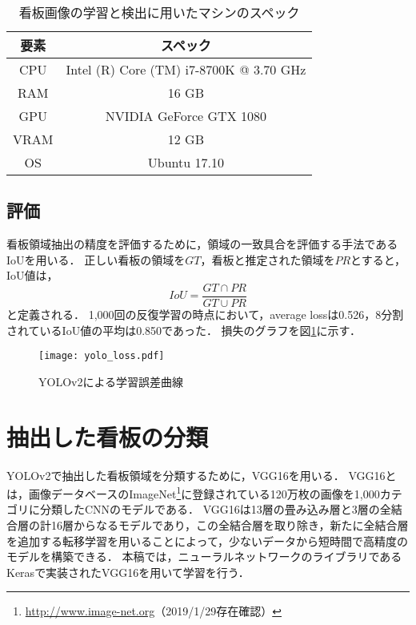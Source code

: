     \begin{table}[tb]
      \caption{看板画像の学習と検出に用いたマシンのスペック}
      \label{table:machine}
      \begin{center}
        \begin{tabular}{c|c}
          \hline\hline
          \textbf{要素} & \textbf{スペック} \\
          \hline
          CPU & Intel (R) Core (TM) i7-8700K @ 3.70 GHz \\
          RAM & 16 GB \\
          GPU & NVIDIA GeForce GTX 1080 \\
          VRAM & 12 GB \\
          OS & Ubuntu 17.10 \\
          \hline
        \end{tabular}
      \end{center}
    \end{table}

  \subsection{評価}
    看板領域抽出の精度を評価するために，領域の一致具合を評価する手法であるIoUを用いる．
    正しい看板の領域を$GT$，看板と推定された領域を$PR$とすると，IoU値は，
    \begin{equation}
      IoU = \frac{GT \cap PR}{GT \cup PR}
    \end{equation}
    と定義される．
    1,000回の反復学習の時点において，average lossは0.526，8分割されているIoU値の平均は0.850であった．
    損失のグラフを図\ref{figure:yolo_loss}に示す．

    \begin{figure}[tb]
      \centerline{\texttt{[image: yolo\_loss.pdf]}}
      \caption{YOLOv2による学習誤差曲線}
      \label{figure:yolo_loss}
    \end{figure}

\section{抽出した看板の分類}
  YOLOv2で抽出した看板領域を分類するために，VGG16を用いる．
  VGG16とは，画像データベースのImageNet\footnote{\url{http://www.image-net.org}（2019/1/29存在確認）}に登録されている120万枚の画像を1,000カテゴリに分類したCNNのモデルである．
  VGG16は13層の畳み込み層と3層の全結合層の計16層からなるモデルであり，この全結合層を取り除き，新たに全結合層を追加する転移学習を用いることによって，少ないデータから短時間で高精度のモデルを構築できる．
  本稿では，ニューラルネットワークのライブラリであるKeras\cite{Chollet:2015}で実装されたVGG16を用いて学習を行う．

